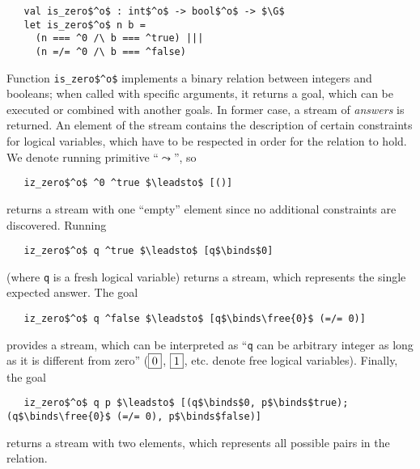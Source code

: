\begin{lstlisting}
   val is_zero$^o$ : int$^o$ -> bool$^o$ -> $\G$
   let is_zero$^o$ n b = 
     (n === ^0 /\ b === ^true) |||
     (n =/= ^0 /\ b === ^false)
\end{lstlisting}

Function \lstinline|is_zero$^o$| implements a binary relation between integers and booleans; when called with specific arguments, it returns a goal, which can be executed or combined with another goals. In former case, a stream of \emph{answers} is returned. An element of the stream contains the description of certain constraints for logical variables, which have to be respected in order for the relation to hold. We denote running primitive ``$\leadsto$'', so

\begin{lstlisting}
   iz_zero$^o$ ^0 ^true $\leadsto$ [()]
\end{lstlisting}

\noindent returns a stream with one ``empty'' element since no additional constraints are discovered. 
Running 

\begin{lstlisting}
   iz_zero$^o$ q ^true $\leadsto$ [q$\binds$0]
\end{lstlisting}

\noindent (where \lstinline|q| is a fresh logical variable) returns a stream, which represents the single expected answer. The goal

\begin{lstlisting}
   iz_zero$^o$ q ^false $\leadsto$ [q$\binds\free{0}$ (=/= 0)]
\end{lstlisting}

\noindent provides a stream, which can be interpreted as ``\lstinline|q| can be arbitrary integer as long as it is different from zero'' ($\boxed{0}$, $\boxed{1}$, etc. denote free logical variables). Finally, the goal

\begin{lstlisting}
   iz_zero$^o$ q p $\leadsto$ [(q$\binds$0, p$\binds$true); (q$\binds\free{0}$ (=/= 0), p$\binds$false)]
\end{lstlisting}

\noindent returns a stream with two elements, which represents all possible pairs in the relation.

